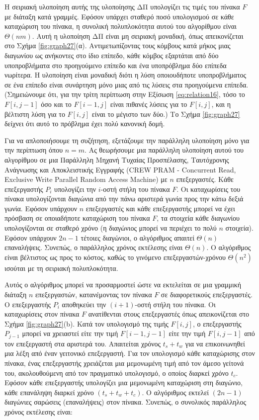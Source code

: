 \documentclass[12pt,a4paper]{article}
\begin{document}
Η σειριακή υλοποίηση αυτής της υλοποίησης ΔΠ υπολογίζει τις τιμές
του πίνακα $F$ με διάταξη κατά γραμμές. Εφόσον υπάρχει σταθερό ποσό
υπολογισμού σε κάθε καταχώριση του πίνακα, η συνολική πολυπλοκότητα
αυτού του αλγορίθμου είναι $\Theta(nm)$. Αυτή η υλοποίηση ΔΠ είναι
μη σειριακή μοναδική, όπως απεικονίζεται στο Σχήμα \ref{fig:graph27}(α).
Αντιμετωπίζοντας τους κόμβους κατά μήκος μιας διαγωνίου ως ανήκοντες
στο ίδιο επίπεδο, κάθε κόμβος εξαρτάται από δύο υποπροβλήματα στο
προηγούμενο επίπεδο και ένα υποπρόβλημα δύο επίπεδα νωρίτερα. Η
υλοποίηση είναι μοναδική διότι η λύση οποιουδήποτε υποπροβλήματος
σε ένα επίπεδο είναι συνάρτηση μόνο μιας από τις λύσεις στα
προηγούμενα επίπεδα. (Σημειώνουμε ότι, για την τρίτη περίπτωση στην
Εξίσωση \ref{eq:relation16}, τόσο το $F[i, j-1]$ όσο και το $F[i-1, j]$ είναι
πιθανές λύσεις για το $F[i, j]$, και η βέλτιστη λύση για το $F[i, j]$
είναι το μέγιστο των δύο.) Το Σχήμα \ref{fig:graph27} δείχνει ότι αυτό το πρόβλημα
έχει πολύ κανονική δομή.

Για να απλοποιήσουμε τη συζήτηση, εξετάζουμε την παράλληλη υλοποίηση
μόνο για την περίπτωση όπου $n = m$. Ας θεωρήσουμε μια παράλληλη
υλοποίηση αυτού του αλγορίθμου σε μια Παράλληλη Μηχανή Τυχαίας 
Προσπέλασης, Ταυτόχρονης Ανάγνωσης και Αποκλειστικής Εγγραφής 
(\foreignlanguage{english}{CREW PRAM - Concurrent Read, Exclusive Write 
Parallel Random Access Machine}) με $n$ επεξεργαστές.
Κάθε επεξεργαστής $P_i$ υπολογίζει την $i$-οστή στήλη του πίνακα $F$.
Οι καταχωρίσεις του πίνακα υπολογίζονται διαγώνια από την πάνω αριστερά
γωνία προς την κάτω δεξιά γωνία. Εφόσον υπάρχουν $n$ επεξεργαστές και 
κάθε επεξεργαστής μπορεί να έχει πρόσβαση σε οποιαδήποτε καταχώριση του 
πίνακα $F$, τα στοιχεία κάθε διαγωνίου υπολογίζονται σε σταθερό χρόνο 
(η διαγώνιος μπορεί να περιέχει το πολύ $n$ στοιχεία). Εφόσον υπάρχουν 
$2n - 1$ τέτοιες διαγώνιοι, ο αλγόριθμος απαιτεί $\Theta(n)$ επαναλήψεις. 
Συνεπώς, ο παράλληλος χρόνος εκτέλεσης είναι $\Theta(n)$. Ο αλγόριθμος 
είναι βέλτιστος ως προς το κόστος, καθώς το γινόμενο 
επεξεργαστών-χρόνου $\Theta(n^2)$ ισούται με τη σειριακή πολυπλοκότητα.

Αυτός ο αλγόριθμος μπορεί να προσαρμοστεί ώστε να εκτελείται σε μια 
γραμμική διάταξη $n$ επεξεργαστών, κατανέμοντας τον πίνακα $F$ σε 
διαφορετικούς επεξεργαστές. Ο επεξεργαστής $P_i$ αποθηκεύει την 
$(i + 1)$-οστή στήλη του πίνακα. Οι καταχωρίσεις στον πίνακα $F$ 
ανατίθενται στους επεξεργαστές όπως απεικονίζεται στο Σχήμα \ref{fig:graph27}(b). 
Κατά τον υπολογισμό της τιμής $F[i, j]$, ο επεξεργαστής $P_{j-1}$ 
μπορεί να χρειαστεί είτε την τιμή $F[i - 1, j - 1]$ είτε την τιμή 
$F[i, j - 1]$ από τον επεξεργαστή στα αριστερά του. Απαιτείται χρόνος 
$t_s + t_w$ για να επικοινωνηθεί μια λέξη από έναν γειτονικό επεξεργαστή.
Για τον υπολογισμό κάθε καταχώρισης στον πίνακα, ένας επεξεργαστής 
χρειάζεται μια μεμονωμένη τιμή από τον άμεσο γείτονά του, ακολουθούμενη 
από τον πραγματικό υπολογισμό, ο οποίος διαρκεί χρόνο $t_c$. Εφόσον 
κάθε επεξεργαστής υπολογίζει μια μεμονωμένη καταχώριση στη διαγώνιο, 
κάθε επανάληψη διαρκεί χρόνο $(t_s + t_w + t_c)$. Ο αλγόριθμος εκτελεί 
$(2n - 1)$ διαγώνιες σαρώσεις (επαναλήψεις) στον πίνακα. Συνεπώς, ο 
συνολικός παράλληλος χρόνος εκτέλεσης είναι:
\end{document}
